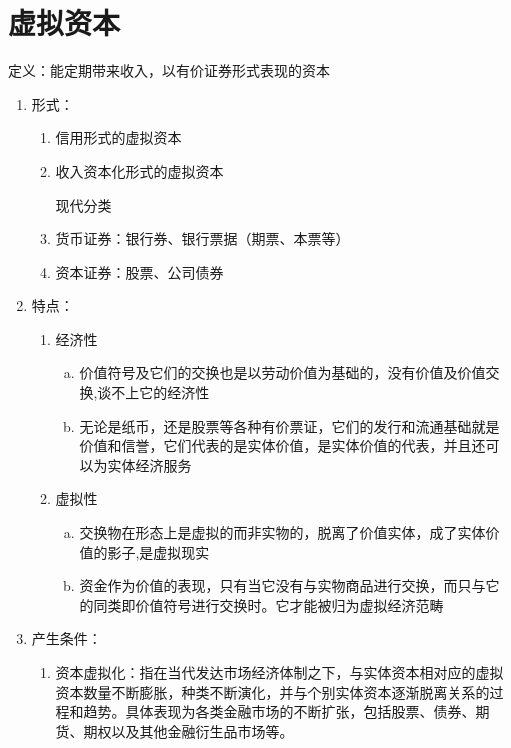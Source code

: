 \documentclass[12pt]{book}
\begin{document}
\section{虚拟资本}

定义：能定期带来收入，以有价证券形式表现的资本
\\

\begin{enumerate}[1.]
    \item 形式：
          \begin{enumerate}[(1)]
              \item 信用形式的虚拟资本
              \item 收入资本化形式的虚拟资本
                    \par * 现代分类
              \item 货币证券：银行券、银行票据（期票、本票等）
              \item 资本证券：股票、公司债券
          \end{enumerate}
    \item 特点：
          \begin{enumerate}[(1)]
              \item 经济性
                    \begin{enumerate}[a.]
                        \item 价值符号及它们的交换也是以劳动价值为基础的，没有价值及价值交换,谈不上它的经济性
                        \item 无论是纸币，还是股票等各种有价票证，它们的发行和流通基础就是价值和信誉，它们代表的是实体价值，是实体价值的代表，并且还可以为实体经济服务
                    \end{enumerate}
              \item 虚拟性
                    \begin{enumerate}[a.]
                        \item 交换物在形态上是虚拟的而非实物的，脱离了价值实体，成了实体价值的影子,是虚拟现实
                        \item 资金作为价值的表现，只有当它没有与实物商品进行交换，而只与它的同类即价值符号进行交换时。它才能被归为虚拟经济范畴
                    \end{enumerate}
          \end{enumerate}
    \item 产生条件：
          \begin{enumerate}[(1)]
              \item 资本虚拟化：指在当代发达市场经济体制之下，与实体资本相对应的虚拟资本数量不断膨胀，种类不断演化，并与个别实体资本逐渐脱离关系的过程和趋势。具体表现为各类金融市场的不断扩张，包括股票、债券、期货、期权以及其他金融衍生品市场等。

\end{enumerate}
\end{enumerate}
\end{document}
